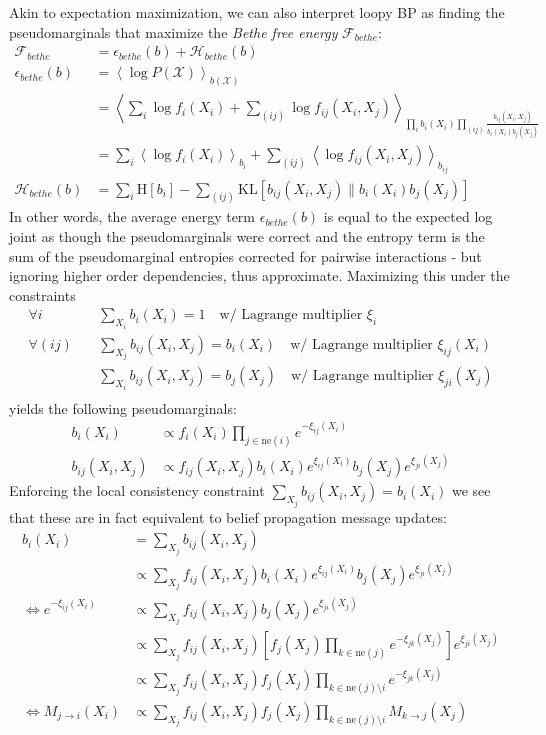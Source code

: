 \documentclass[a4paper]{article}
\begin{document}
Akin to expectation maximization, we can also interpret loopy BP as finding the pseudomarginals that maximize the \emph{Bethe free energy} $\mathcal{F}_{bethe}$:
\begin{align*}
\mathcal{F}_{bethe} &= \epsilon_{bethe}(b) + \mathcal{H}_{bethe}(b) \\
\epsilon_{bethe}(b) &= \left\langle \log P(\mathcal{X}) \right\rangle_{b(\mathcal{X})} \\
&= \left\langle \sum_i \log f_i(X_i) + \sum_{(ij)} \log f_{ij}(X_i,X_j) \right\rangle_{\prod_i b_i(X_i) \prod_{(ij)} \frac{b_{ij}(X_i,X_j)}{b_i(X_i)b_j(X_j)}} \\
&= \sum_i \left\langle\log f_i(X_i)\right\rangle_{b_i} + \sum_{(ij)} \left\langle\log f_{ij}(X_i,X_j)\right\rangle_{b_{ij}} \\
\mathcal{H}_{bethe}(b) &= \sum_i \textrm{H}[b_i] - \sum_{(ij)}\textrm{KL}[b_{ij}(X_i,X_j)\|b_i(X_i)b_j(X_j)]
\end{align*}
In other words, the average energy term $\epsilon_{bethe}(b)$ is equal to the expected log joint as though the pseudomarginals were correct and the entropy term is the sum of the pseudomarginal entropies corrected for pairwise interactions - but ignoring higher order dependencies, thus approximate. Maximizing this under the constraints
\begin{align*}
\forall i \quad &\sum_{X_i}b_i(X_i) = 1 \quad \text{w/ Lagrange multiplier } \xi_i \\
\forall (ij) \quad &\sum_{X_j}b_{ij}(X_i,X_j) = b_i(X_i) \quad \text{w/ Lagrange multiplier } \xi_{ij}(X_i) \\
&\sum_{X_i}b_{ij}(X_i,X_j) = b_j(X_j) \quad \text{w/ Lagrange multiplier } \xi_{ji}(X_j) \\
\end{align*}
yields the following pseudomarginals:
\begin{align*}
b_i(X_i) &\propto f_i(X_i)\prod_{j\in\textrm{ne}(i)} e^{-\xi_{ij}(X_i)} \\
b_{ij}(X_i,X_j) &\propto f_{ij}(X_i,X_j)b_i(X_i)e^{\xi_{ij}(X_i)}b_j(X_j)e^{\xi_{ji}(X_j)}
\end{align*}
Enforcing the local consistency constraint $\sum_{X_j}b_{ij}(X_i,X_j) = b_i(X_i)$ we see that these are in fact equivalent to belief propagation message updates:
\begin{align*}
b_i(X_i) &= \sum_{X_j} b_{ij}(X_i,X_j) \\
&\propto \sum_{X_j}f_{ij}(X_i,X_j)b_i(X_i)e^{\xi_{ij}(X_i)}b_j(X_j)e^{\xi_{ji}(X_j)} \\
\Leftrightarrow e^{-\xi_{ij}(X_i)} &\propto \sum_{X_j}f_{ij}(X_i,X_j)b_j(X_j)e^{\xi_{ji}(X_j)} \\
&\propto \sum_{X_j}f_{ij}(X_i,X_j)\left[f_j(X_j)\prod_{k\in\textrm{ne}(j)} e^{-\xi_{jk}(X_j)}\right]e^{\xi_{ji}(X_j)} \\
&\propto \sum_{X_j}f_{ij}(X_i,X_j)f_j(X_j)\prod_{k\in\textrm{ne}(j)\setminus i} e^{-\xi_{jk}(X_j)} \\
\Leftrightarrow M_{j \rightarrow i}(X_i) &\propto \sum_{X_j}f_{ij}(X_i,X_j)f_j(X_j)\prod_{k\in\textrm{ne}(j)\setminus i} M_{k \rightarrow j}(X_j) \\
\end{align*}
\end{document}
